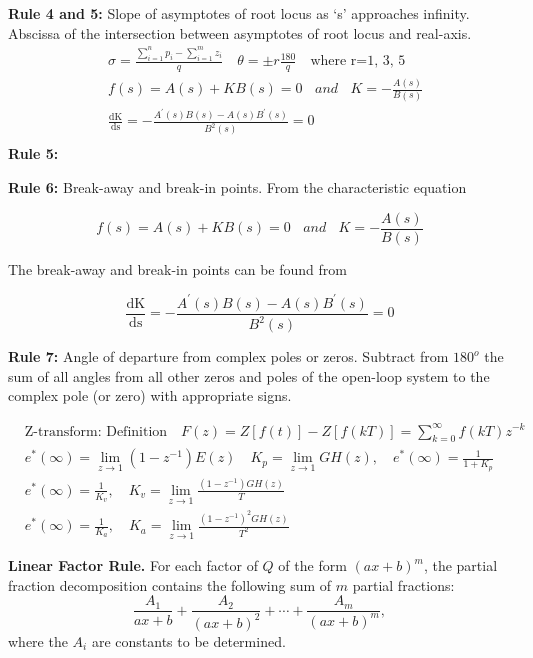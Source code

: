 \textbf{Rule 4 and 5:} Slope of asymptotes of root locus as `s' approaches infinity. \newline Abscissa of the intersection between asymptotes of root locus and real-axis.
\begin{align*}
& \sigma  = {\frac{\sum\limits_{i = 1}^n {{p_i}}  - \sum\limits_{i = 1}^m {{z_i}} }{q}} \quad \theta = \pm r{\frac{180}{q}} \quad \text{where r=1, 3, 5} \\
& f\left( s \right) = A\left( s \right) + KB\left( s \right) = 0\ \ \ \ and\ \ \ \ K = - \frac{A\left( s \right)}{B\left( s \right)} \\
& \frac{\text{dK}}{\text{ds}} = - \frac{A^{'}\left( s \right)B\left( s \right) - A\left( s \right)B^{'}\left( s \right)}{B^{2}\left( s \right)} = 0 \\
 \end{align*}
 \textbf{Rule 5:} 

 \textbf{Rule 6:} Break-away and break-in points. From the characteristic
  equation

  \[f\left( s \right) = A\left( s \right) + KB\left( s \right) = 0\ \ \ \ and\ \ \ \ K = - \frac{A\left( s \right)}{B\left( s \right)}\]

  The break-away and break-in points can be found from

  \[\frac{\text{dK}}{\text{ds}} = - \frac{A^{'}\left( s \right)B\left( s \right) - A\left( s \right)B^{'}\left( s \right)}{B^{2}\left( s \right)} = 0 \]

  \textbf{Rule 7:} Angle of departure from complex poles or zeros.
  Subtract from $180^o$ the sum of all angles from all other zeros and poles
  of the open-loop system to the complex pole (or zero) with appropriate signs. 

 \begin{align*}
& \text{Z-transform: Definition} \quad F(z)=Z[f(t)]-Z[f(kT)]=\sum_{k=0}^{\infty}f(kT)z^{-k} \\
& e^\ast(\infty)=\lim_{z \rightarrow 1} (1-z^{-1})E(z) \quad K_p=\lim_{z \rightarrow 1} GH(z), \quad e^\ast (\infty) = \frac{1}{1+K_p} \\
& e^\ast(\infty) = \frac{1}{K_v}, \quad K_v =  \lim_{z \rightarrow 1} \frac{(1-z^{-1}) GH(z)}{T}  \\
& e^\ast(\infty) = \frac{1}{K_a}, \quad K_a =  \lim_{z \rightarrow 1}\frac{(1-z^{-1})^2 GH(z)}{T^2}
\end{align*}

{\bf Linear Factor Rule.}  
 For each factor of $Q$ of the form $(ax+b)^m$, 
 the partial fraction decomposition contains 
 the following sum of $m$ partial fractions:  
\[
\frac{A_1}{ax+b} + \frac{A_2}{(ax+b)^2} + \cdots + \frac{A_m}{(ax+b)^m},
\]
 where the $A_i$ are constants to be determined.  

